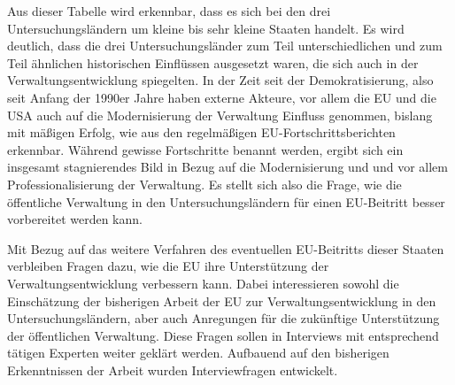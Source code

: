 Aus dieser Tabelle wird erkennbar, dass es sich bei den drei Untersuchungsländern um kleine bis sehr kleine Staaten handelt. Es wird deutlich, dass die drei Untersuchungsländer zum Teil unterschiedlichen und zum Teil ähnlichen historischen Einflüssen ausgesetzt waren, die sich auch in der Verwaltungsentwicklung spiegelten. In der Zeit seit der Demokratisierung, also seit Anfang der 1990er Jahre haben externe Akteure, vor allem die EU und die USA auch auf die Modernisierung der Verwaltung Einfluss genommen, bislang mit mäßigen Erfolg, wie aus den regelmäßigen EU-Fortschrittsberichten erkennbar. Während gewisse Fortschritte benannt werden, ergibt sich ein insgesamt stagnierendes Bild in Bezug auf die Modernisierung und und vor allem Professionalisierung der Verwaltung. Es stellt sich also die Frage, wie die öffentliche Verwaltung in den Untersuchungsländern für einen EU-Beitritt besser vorbereitet werden kann.\par
Mit Bezug auf das weitere Verfahren des eventuellen EU-Beitritts dieser Staaten verbleiben Fragen dazu, wie die EU ihre Unterstützung der Verwaltungsentwicklung verbessern kann. Dabei interessieren sowohl die Einschätzung der bisherigen Arbeit der EU zur Verwaltungsentwicklung in den Untersuchungsländern, aber auch Anregungen für die zukünftige Unterstützung der öffentlichen Verwaltung. Diese Fragen sollen in Interviews mit entsprechend tätigen Experten weiter geklärt werden. Aufbauend auf den bisherigen Erkenntnissen der Arbeit wurden Interviewfragen entwickelt.
